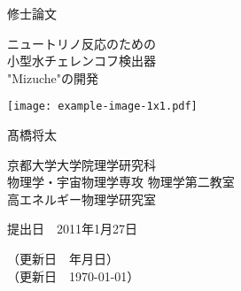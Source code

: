 \documentclass[11pt,draft]{ltjsreport}
\begin{document}
\begin{titlepage}

    \centering

    \begingroup
    \Large
    修士論文
    \endgroup

    \vspace{1cm}

    \begingroup
    \Huge
    ニュートリノ反応のための\\
    小型水チェレンコフ検出器\\ [0.4cm]
    "Mizuche"の開発
    \endgroup

    \vspace{1cm}

    \begingroup
    \texttt{[image: example-image-1x1.pdf]}
    \endgroup

    \vspace{1cm}

    \begingroup
    \Large
    髙橋将太
    \endgroup

    \vspace{1cm}

    \begingroup
    \large
    京都大学大学院理学研究科\\
    物理学・宇宙物理学専攻 物理学第二教室\\
    高エネルギー物理学研究室
    \endgroup

    \vspace{1cm}
    
    \begingroup
    提出日　2011年1月27日\\
    \endgroup

    \begingroup
    （更新日　\the\year 年\the\month 月\the\day 日）\\
    （更新日　\today）
    \endgroup


\end{titlepage}




\tableofcontents
















%
%
\end{document}
